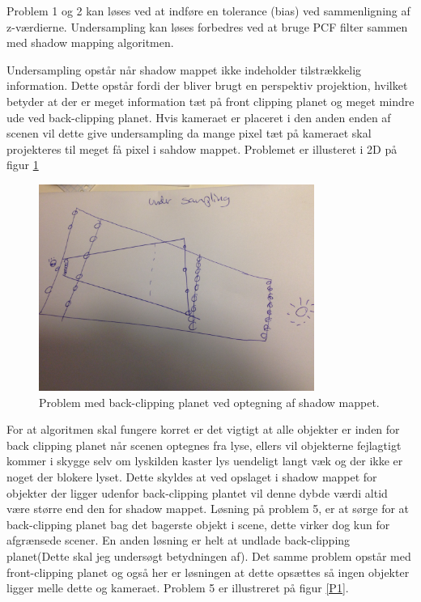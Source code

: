 \documentclass[11pt,a4paper]{article}
\begin{document}
Problem 1 og 2 kan løses ved at indføre en tolerance (bias) ved sammenligning af z-værdierne. Undersampling kan løses forbedres ved at bruge PCF filter sammen med shadow mapping algoritmen.

Undersampling opstår når shadow mappet ikke indeholder tilstrækkelig information.  Dette opstår fordi der bliver brugt en perspektiv projektion, hvilket betyder at der er meget information tæt på front clipping planet og meget mindre ude ved back-clipping planet. Hvis kameraet er placeret i den anden enden af scenen vil dette give undersampling da mange pixel tæt på kameraet skal projekteres til meget få pixel i sahdow mappet. Problemet er illusteret i 2D på figur \ref{P2}

\begin{figure}[ht!]
\centering
\includegraphics[width=90mm]{img/P2.jpg}
\caption{Problem med back-clipping planet ved optegning af shadow mappet.}
\label{P2}
\end{figure}

For at algoritmen skal fungere korret er det vigtigt at alle objekter er inden for back clipping  planet når scenen optegnes fra lyse, ellers vil objekterne fejlagtigt kommer i skygge selv om lyskilden kaster lys uendeligt langt væk og der ikke er noget der blokere lyset. Dette skyldes at ved opslaget i shadow mappet for objekter der ligger udenfor back-clipping plantet vil denne dybde værdi altid være større end den for shadow mappet. Løsning på problem 5, er at sørge for at back-clipping planet bag det bagerste objekt i scene, dette virker dog kun for afgrænsede scener. En anden løsning er helt at undlade back-clipping planet(Dette skal jeg undersøgt betydningen af). Det samme problem opstår med front-clipping planet og også her er løsningen at dette opsættes så ingen objekter ligger melle dette og kameraet. Problem 5 er illustreret på figur  \ref{P1}.
\end{document}
